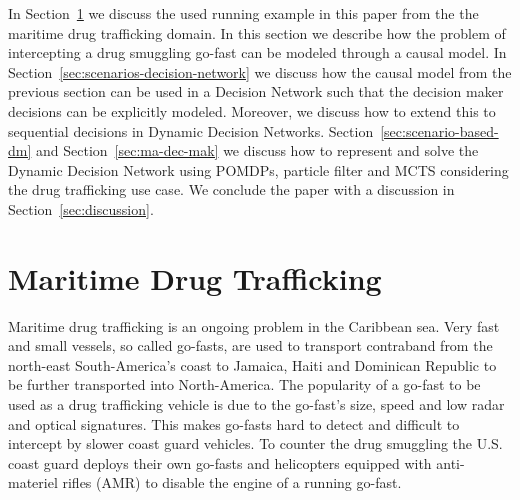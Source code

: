 \documentclass[conference]{IEEEtran}
\begin{document}
In Section~\ref{sec:maritime-drug-trafficking} we discuss the used running example in this paper from the the maritime drug trafficking domain. In this section we describe how the problem of intercepting a drug smuggling go-fast can be modeled through a causal model. In Section~\ref{sec:scenarios-decision-network} we discuss how the causal model from the previous section can be used in a Decision Network such that the decision maker decisions can be explicitly modeled. Moreover, we discuss how to extend this to sequential decisions in Dynamic Decision Networks. Section~\ref{sec:scenario-based-dm} and Section~\ref{sec:ma-dec-mak} we discuss how to represent and solve the Dynamic Decision Network using POMDPs, particle filter and MCTS considering the drug trafficking use case. We conclude the paper with a discussion in Section~\ref{sec:discussion}.

\section{Maritime Drug Trafficking}\label{sec:maritime-drug-trafficking}


Maritime drug trafficking is an ongoing problem in the Caribbean sea. Very fast and small vessels, so called go-fasts, are used to transport contraband from the north-east South-America's coast to Jamaica, Haiti and Dominican Republic to be further transported into North-America. The popularity of a go-fast to be used as a drug trafficking vehicle is due to the go-fast's size, speed and low radar and optical signatures. This makes go-fasts hard to detect and difficult to intercept by slower coast guard vehicles. To counter the drug smuggling the U.S. coast guard deploys their own go-fasts and helicopters equipped with anti-materiel rifles (AMR) to disable the engine of a running go-fast. 
\end{document}
